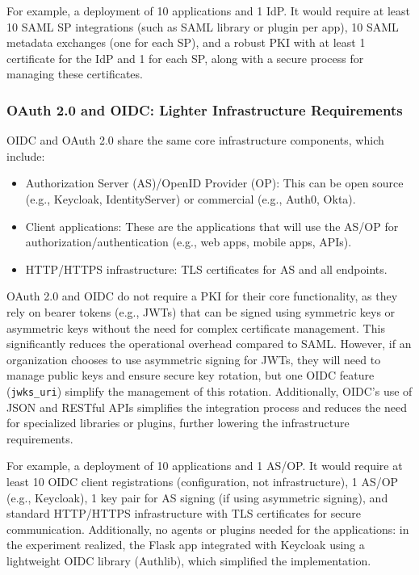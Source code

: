 \documentclass[../memoire.tex]{subfiles}
\begin{document}
For example, a deployment of 10 applications and 1 IdP. It would require at least 10 SAML SP integrations (such as SAML library or plugin per app), 10 SAML metadata exchanges (one for each SP), and a robust PKI with at least 1 certificate for the IdP and 1 for each SP, along with a secure process for managing these certificates. 

\subsubsection{OAuth 2.0 and OIDC: Lighter Infrastructure Requirements}

OIDC and OAuth 2.0 share the same core infrastructure components\cite[p.~246]{richer2017}, which include:
\begin{itemize}
    \item Authorization Server (AS)/OpenID Provider (OP): This can be open source (e.g., Keycloak, IdentityServer) or commercial (e.g., Auth0, Okta).
    \item Client applications: These are the applications that will use the AS/OP for authorization/authentication (e.g., web apps, mobile apps, APIs).
    \item HTTP/HTTPS infrastructure: TLS certificates for AS and all endpoints.
\end{itemize}

OAuth 2.0 and OIDC do not require a PKI for their core functionality, as they rely on bearer tokens (e.g., JWTs) that can be signed using symmetric keys or asymmetric keys without the need for complex certificate management. This significantly reduces the operational overhead compared to SAML. However, if an organization chooses to use asymmetric signing for JWTs, they will need to manage public keys and ensure secure key rotation, but one OIDC feature (\texttt{jwks\_uri}) simplify the management of this rotation\cite[section.~3]{oidc_core}. Additionally, OIDC's use of JSON and RESTful APIs simplifies the integration process and reduces the need for specialized libraries or plugins, further lowering the infrastructure requirements.

For example, a deployment of 10 applications and 1 AS/OP. It would require at least 10 OIDC client registrations (configuration, not infrastructure), 1 AS/OP (e.g., Keycloak), 1 key pair for AS signing (if using asymmetric signing), and standard HTTP/HTTPS infrastructure with TLS certificates for secure communication. Additionally, no agents or plugins needed for the applications: in the experiment realized, the Flask app integrated with Keycloak using a lightweight OIDC library (Authlib), which simplified the implementation.
\end{document}
